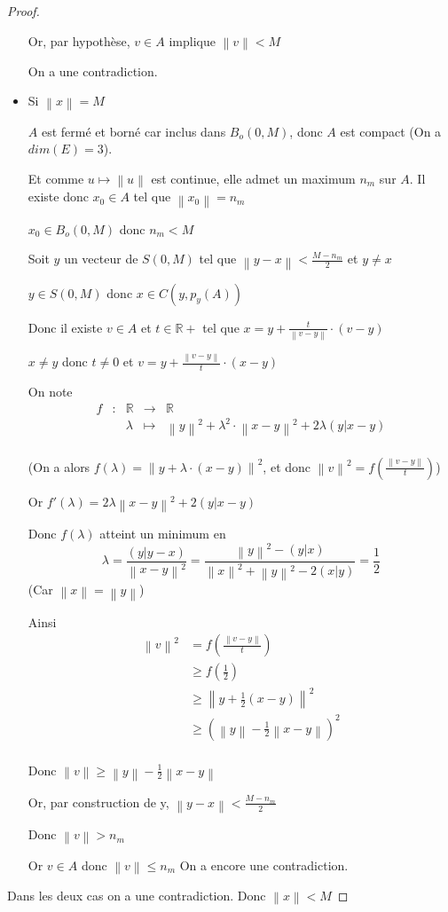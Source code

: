 \documentclass[a4paper]{article}
\newcommand{\norm}[1]{\left\lVert#1\right\rVert}
\begin{document}
\begin{proof}
\begin{itemize}
Or, par hypothèse, $v \in A$ implique $\norm{v} < M$

On a une contradiction.

\bigskip

\item Si  $\norm{x} = M$

$A$ est fermé et borné car inclus dans $B_{o}(0, M)$, donc $A$ est compact (On a $dim(E) = 3$).

Et comme $u \mapsto \norm{u}$ est continue, elle admet un maximum $n_{m}$ sur $A$. Il existe donc $x_{0} \in A$ tel que $\norm{x_{0}} = n_{m}$

$x_{0} \in B_{o}(0, M)$ donc $n_{m} < M$

Soit $y$ un vecteur de $S(0, M)$ tel que $\norm{y - x} < \frac{M - n_{m}}{2}$ et $y \neq x$

$y \in S(0, M)$ donc $x \in C(y, p_{y}(A))$

Donc il existe $v \in A$ et $t \in \mathbb{R}+$ tel que $x = y + \frac{t}{\norm{v - y}} \cdot (v - y)$

$x \neq y$ donc $t \neq 0$ et $v = y + \frac{\norm{v - y}}{t} \cdot (x - y)$

On note 
\[\begin{array}{ccccl}
f & : & \mathbb{R} & \to & \mathbb{R} \\
 & & \lambda & \mapsto & \norm{y}^{2} + \lambda^{2} \cdot \norm{x - y}^{2} + 2 \lambda (y|x - y)\\
\end{array}\]

(On a alors $f(\lambda) = \norm{y + \lambda \cdot (x - y)}^{2}$, et donc $\norm{v}^{2} = f(\frac{\norm{v - y}}{t})$)

Or $f'(\lambda) = 2 \lambda \norm{x - y}^{2} + 2(y|x - y)$

Donc $f(\lambda)$ atteint un minimum en
\[\lambda = \frac{(y|y - x)}{\norm{x - y}^2} = \frac{\norm{y}^{2} - (y|x)}{\norm{x}^{2} + \norm{y}^{2} - 2 (x|y)} = \frac{1}{2}\]
(Car $\norm{x} = \norm{y}$)

\medskip

Ainsi 
\begin{align*}
\norm{v}^{2} &= f(\frac{\norm{v - y}}{t}) \\
             &\geqslant f(\frac{1}{2}) \\
             &\geqslant \norm{y + \frac{1}{2} (x - y)}^{2} \\
             &\geqslant (\norm{y} - \frac{1}{2} \norm{x - y})^{2} \\
\end{align*}

Donc $\norm{v} \geqslant \norm{y} - \frac{1}{2} \norm{x - y}$

Or, par construction de y, $\norm{y - x} < \frac{M - n_{m}}{2}$

Donc $\norm{v} > n_{m}$

Or $v \in A$  donc $\norm{v} \leqslant n_{m}$
On a encore une contradiction.
\end{itemize}

\medskip

Dans les deux cas on a une contradiction.
Donc $\norm{x} < M$
\end{proof}
\end{document}
